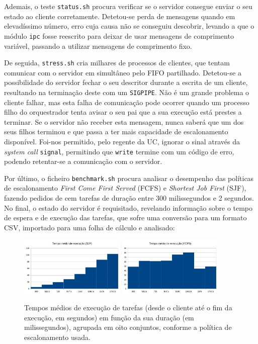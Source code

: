 \documentclass[11pt]{article}
\begin{document}
Ademais, o teste \texttt{status.sh} procura verificar se o servidor consegue enviar o seu estado ao
cliente corretamente. Detetou-se perda de mensagens quando em elevadíssimo número, erro cuja causa
não se conseguiu descobrir, levando a que o módulo \texttt{ipc} fosse reescrito para deixar de usar
mensagens de comprimento variável, passando a utilizar mensagens de comprimento fixo.

De seguida, \texttt{stress.sh} cria milhares de processos de clientes, que tentam comunicar com o
servidor em simultâneo pelo FIFO partilhado. Detetou-se a possibilidade do servidor fechar o seu
descritor durante a escrita de um cliente, resultando na terminação deste com um \texttt{SIGPIPE}.
Não é um grande problema o cliente falhar, mas esta falha de comunicação pode ocorrer quando um
processo filho do orquestrador tenta avisar o seu pai que a sua execução está prestes a terminar.
Se o servidor não receber esta mensagem, nunca saberá que um dos seus filhos terminou e que passa a
ter mais capacidade de escalonamento disponível. Foi-nos permitido, pelo regente da UC, ignorar o
sinal através da \emph{system call} \texttt{signal}, permitindo que \texttt{write} termine com um
código de erro, podendo retentar-se a comunicação com o servidor.

Por último, o ficheiro \texttt{benchmark.sh} procura analisar o desempenho das políticas de
escalonamento \emph{First Come First Served} (FCFS) e \emph{Shortest Job First} (SJF), fazendo
pedidos de cem tarefas de duração entre 300 milissegundos e 2 segundos. No final, o estado do
servidor é requisitado, revelando informação sobre o tempo de espera e de execução das tarefas, que
sofre uma conversão para um formato CSV, importado para uma folha de cálculo e analisado:

\begin{figure}[H]
    \centering
    \includegraphics[width=0.45\textwidth]{report_figures/HistogramSJF.png}
    \includegraphics[width=0.45\textwidth]{report_figures/HistogramFCFS.png}
    \caption{Tempos médios de execução de tarefas (desde o cliente até o fim da execução, em
        segundos) em função da sua duração (em milissegundos), agrupada em oito conjuntos, conforme
        a política de escalonamento usada.}
\end{figure}
\end{document}
